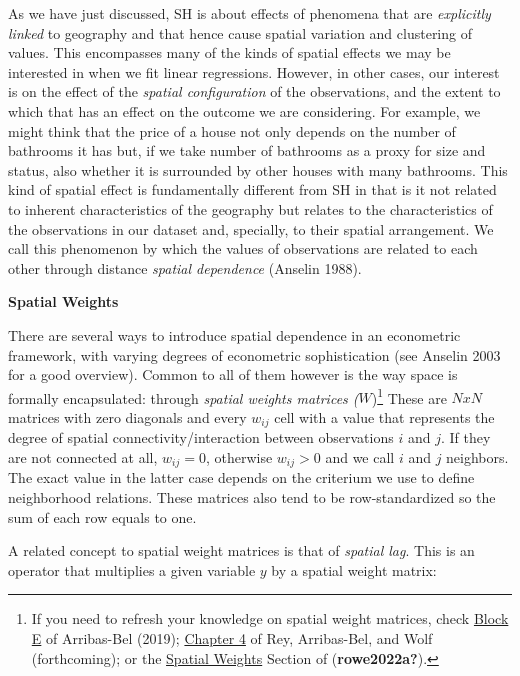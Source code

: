 \documentclass[
  letterpaper,
  krantz2]{style/krantz}
\begin{document}
As we have just discussed, SH is about effects of phenomena that are
\emph{explicitly linked} to geography and that hence cause spatial
variation and clustering of values. This encompasses many of the kinds
of spatial effects we may be interested in when we fit linear
regressions. However, in other cases, our interest is on the effect of
the \emph{spatial configuration} of the observations, and the extent to
which that has an effect on the outcome we are considering. For example,
we might think that the price of a house not only depends on the number
of bathrooms it has but, if we take number of bathrooms as a proxy for
size and status, also whether it is surrounded by other houses with many
bathrooms. This kind of spatial effect is fundamentally different from
SH in that is it not related to inherent characteristics of the
geography but relates to the characteristics of the observations in our
dataset and, specially, to their spatial arrangement. We call this
phenomenon by which the values of observations are related to each other
through distance \emph{spatial dependence} (Anselin 1988).

\textbf{Spatial Weights}

There are several ways to introduce spatial dependence in an econometric
framework, with varying degrees of econometric sophistication (see
Anselin 2003 for a good overview). Common to all of them however is the
way space is formally encapsulated: through \emph{spatial weights
matrices (}\(W\))\footnote{If you need to refresh your knowledge on
  spatial weight matrices, check
  \href{https://darribas.org/gds_course/content/bE/concepts_E.html}{Block
  E} of Arribas-Bel (2019);
  \href{https://geographicdata.science/book/notebooks/04_spatial_weights.html}{Chapter
  4} of Rey, Arribas-Bel, and Wolf (forthcoming); or the
  \href{https://fcorowe.github.io/intro-gds/03-spatial_weights.html}{Spatial
  Weights} Section of (\textbf{rowe2022a?}).} These are \(NxN\) matrices
with zero diagonals and every \(w_{ij}\) cell with a value that
represents the degree of spatial connectivity/interaction between
observations \(i\) and \(j\). If they are not connected at all,
\(w_{ij}=0\), otherwise \(w_{ij}>0\) and we call \(i\) and \(j\)
neighbors. The exact value in the latter case depends on the criterium
we use to define neighborhood relations. These matrices also tend to be
row-standardized so the sum of each row equals to one.

A related concept to spatial weight matrices is that of \emph{spatial
lag}. This is an operator that multiplies a given variable \(y\) by a
spatial weight matrix:
\end{document}
